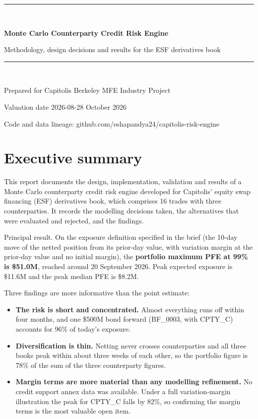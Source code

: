 \documentclass[11pt,letterpaper]{article}
\begin{document}
\begin{titlepage}
\vspace*{1.6in}
{\color{navy}\rule{\linewidth}{1.2pt}}\\[1.2em]
{\Huge\bfseries\color{navy} Monte Carlo Counterparty Credit Risk Engine\par}
\vspace{0.6em}
{\Large Methodology, design decisions and results for the ESF derivatives book\par}
\vspace{0.6em}
{\color{navy}\rule{\linewidth}{1.2pt}}\\[2em]
{\large Prepared for Capitolis \textbar{} Berkeley MFE Industry Project\par}
\vspace{0.4em}
{\normalsize Valuation date 2026-08-28 \textbar{} October 2026\par}
\vspace{0.4em}
{\normalsize Code and data lineage: github.com/eshapandya24/capitolis-risk-engine\par}
\end{titlepage}

\tableofcontents
\clearpage

\section{Executive summary}

This report documents the design, implementation, validation and results of a Monte Carlo counterparty credit risk engine developed for Capitolis' equity swap financing (ESF) derivatives book, which comprises 16 trades with three counterparties. It records the modelling decisions taken, the alternatives that were evaluated and rejected, and the findings.

Principal result. On the exposure definition specified in the brief (the 10-day move of the netted position from its prior-day value, with variation margin at the prior-day value and no initial margin), the \textbf{portfolio maximum PFE at 99\% is \$51.0M}, reached around 20 September 2026. Peak expected exposure is \$11.6M and the peak median PFE is \$8.2M.

Three findings are more informative than the point estimate:
\begin{itemize}
\item \textbf{The risk is short and concentrated.} Almost everything runs off within four months, and one \$500M bond forward (BF\_0003, with CPTY\_C) accounts for 96\% of today's exposure.
\item \textbf{Diversification is thin.} Netting never crosses counterparties and all three books peak within about three weeks of each other, so the portfolio figure is 78\% of the sum of the three counterparty figures.
\item \textbf{Margin terms are more material than any modelling refinement.} No credit support annex data was available. Under a full variation-margin illustration the peak for CPTY\_C falls by 82\%, so confirming the margin terms is the most valuable open item.
\end{itemize}
\end{document}
